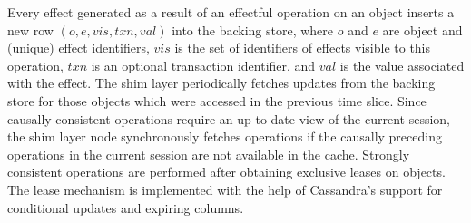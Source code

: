 Every effect generated as a result of an effectful operation on an object
inserts a new row $(o,e,vis,txn,val)$ into the backing store, where $o$ and $e$
are object and (unique) effect identifiers, $vis$ is the set of identifiers of
effects visible to this operation, $txn$ is an optional transaction identifier,
and $val$ is the value associated with the effect. The shim layer periodically
fetches updates from the backing store for those objects which were accessed in
the previous time slice. Since causally consistent operations require an
up-to-date view of the current session, the shim layer node synchronously
fetches operations if the causally preceding operations in the current session
are not available in the cache. Strongly consistent operations are performed
after obtaining exclusive leases on objects. The lease mechanism is implemented
with the help of Cassandra's support for conditional updates and expiring
columns.
